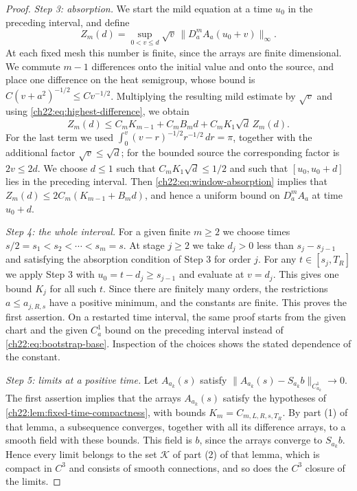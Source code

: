 \begin{proof}
\emph{Step 3: absorption.} We start the mild equation at a time $u_0$ in the preceding interval, and define
\[
 Z_m(d)=\sup_{0<v\le d}\sqrt v\,\|D_a^mA_a(u_0+v)\|_\infty .
\]
At each fixed mesh this number is finite, since the arrays are finite dimensional. We commute $m-1$ differences onto the initial value and onto the source, and place one difference on the heat semigroup, whose bound is $C(v+a^2)^{-1/2}\le Cv^{-1/2}$. Multiplying the resulting mild estimate by $\sqrt v$ and using \eqref{ch22:eq:highest-difference}, we obtain
\begin{equation}\label{ch22:eq:window-absorption}
 Z_m(d)\le C_mK_{m-1}+C_mB_md+C_mK_1\sqrt d\,Z_m(d).
\end{equation}
For the last term we used $\int_0^v(v-r)^{-1/2}r^{-1/2}\,dr=\pi$, together with the additional factor $\sqrt v\le\sqrt d$; for the bounded source the corresponding factor is $2v\le2d$. We choose $d\le1$ such that $C_mK_1\sqrt d\le1/2$ and such that $[u_0,u_0+d]$ lies in the preceding interval. Then \eqref{ch22:eq:window-absorption} implies that $Z_m(d)\le2C_m(K_{m-1}+B_md)$, and hence a uniform bound on $D_a^mA_a$ at time $u_0+d$.

\emph{Step 4: the whole interval.} For a given finite $m\ge2$ we choose times $s/2=s_1<s_2<\cdots<s_m=s$. At stage $j\ge2$ we take $d_j>0$ less than $s_j-s_{j-1}$ and satisfying the absorption condition of Step 3 for order $j$. For any $t\in[s_j,T_R]$ we apply Step 3 with $u_0=t-d_j\ge s_{j-1}$ and evaluate at $v=d_j$. This gives one bound $K_j$ for all such $t$. Since there are finitely many orders, the restrictions $a\le a_{j,R,s}$ have a positive minimum, and the constants are finite. This proves the first assertion. On a restarted time interval, the same proof starts from the given chart and the given $C_a^1$ bound on the preceding interval instead of \eqref{ch22:eq:bootstrap-base}. Inspection of the choices shows the stated dependence of the constant.

\emph{Step 5: limits at a positive time.} Let $A_{a_k}(s)$ satisfy $\|A_{a_k}(s)-S_{a_k}b\|_{C^1_{a_k}}\to0$. The first assertion implies that the arrays $A_{a_k}(s)$ satisfy the hypotheses of \cref{ch22:lem:fixed-time-compactness}, with bounds $K_m=C_{m,L,R,s,T_R}$. By part (1) of that lemma, a subsequence converges, together with all its difference arrays, to a smooth field with these bounds. This field is $b$, since the arrays converge to $S_{a_k}b$. Hence every limit belongs to the set $\mathscr K$ of part (2) of that lemma, which is compact in $C^3$ and consists of smooth connections, and so does the $C^3$ closure of the limits.


\end{proof}
